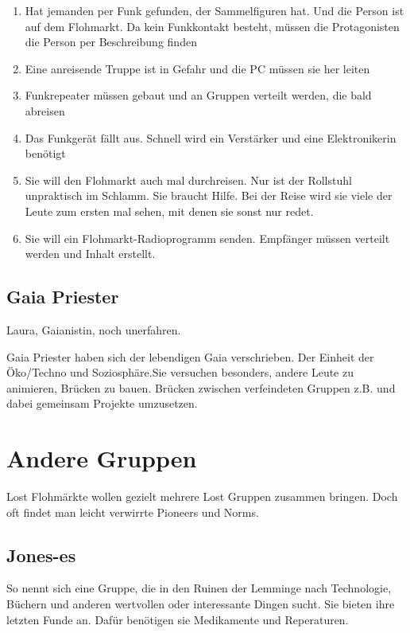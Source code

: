 \begin{enumerate}
\item Hat jemanden per Funk gefunden, der Sammelfiguren hat. Und die Person ist auf dem Flohmarkt. Da kein Funkkontakt besteht, müssen die Protagonisten die Person per Beschreibung finden
\item Eine anreisende Truppe ist in Gefahr und die PC müssen sie her leiten
\item Funkrepeater müssen gebaut und an Gruppen verteilt werden, die bald abreisen
\item Das Funkgerät fällt aus. Schnell wird ein Verstärker und eine Elektronikerin benötigt
\item Sie will den Flohmarkt auch mal durchreisen. Nur ist der Rollstuhl unpraktisch im Schlamm. Sie braucht Hilfe. Bei der Reise wird sie viele der Leute zum ersten mal sehen, mit denen sie sonst nur redet.
\item Sie will ein Flohmarkt-Radioprogramm senden. Empfänger müssen verteilt werden und Inhalt erstellt.
\end{enumerate}

\section{Gaia Priester}

Laura, Gaianistin, noch unerfahren.

Gaia Priester haben sich der lebendigen Gaia verschrieben. Der Einheit der Öko/Techno und Soziosphäre.Sie versuchen besonders, andere Leute zu animieren,  Brücken zu bauen. Brücken zwischen verfeindeten Gruppen z.B. und dabei gemeinsam Projekte umzusetzen.


\chapter{Andere Gruppen}

Lost Flohmärkte wollen gezielt mehrere Lost Gruppen zusammen bringen. Doch oft findet man leicht verwirrte Pioneers und Norms.

\section{Jones-es}

So nennt sich eine Gruppe, die in den Ruinen der Lemminge nach Technologie, Büchern und anderen wertvollen oder interessante Dingen sucht. Sie bieten ihre letzten Funde an. Dafür benötigen sie Medikamente und Reperaturen.

